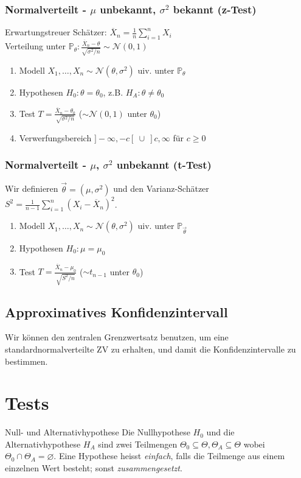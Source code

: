 \documentclass[a4paper,10pt]{article}
\def\P{\mathbb{P}}
\begin{document}
\subsubsection*{\texorpdfstring{Normalverteilt - \(\mu\) unbekannt, \(\sigma^2\) bekannt (z-Test)}{Normalverteilt - μ unbekannt, σ² bekannt (z-Test)}}
Erwartungstreuer Schätzer: \(\overline{X}_n = \frac{1}{n} \sum_{i=1}^n X_i\)\\
Verteilung unter \(\P_\theta: \frac{\overline{X}_n - \theta}{\sqrt{\sigma^2/n}} \sim \mathcal{N}(0,1)\)
\begin{enumerate}
	\item Modell \(X_1, \ldots, X_n \sim \mathcal{N}(\theta, \sigma^2)\) uiv. unter \(\P_\theta\)
	\item Hypothesen \(H_0 : \theta = \theta_0\), z.B. \(H_A : \theta \ne \theta_0\)
	\item Test \(T = \frac{\overline{X}_n - \theta_0}{\sqrt{\sigma^2/n}} \) ($\sim \mathcal{N}(0,1)$ unter $\theta_0$)
	\item Verwerfungsbereich \(]-\infty, -c[ \ \cup \ ] c, \infty\) für \(c\ge 0\)
\end{enumerate}

\subsubsection*{\texorpdfstring{Normalverteilt - \(\mu\), \(\sigma^2\) unbekannt (t-Test)}{Normalverteilt - μ, σ² unbekannt (t-Test)}}
Wir definieren \(\vec{\theta} = (\mu, \sigma^2)\) und den Varianz-Schätzer \(S^2 = \frac{1}{n-1}\sum_{i=1}^n (X_i - \overline{X}_n)^2\).
\begin{enumerate}
	\item Modell \(X_1, \ldots, X_n \sim \mathcal{N}(\theta, \sigma^2)\) uiv. unter \(\P_{\vec{\theta}}\)
	\item Hypothesen $H_0: \mu = \mu_0$
	\item Test \(T = \frac{\overline{X}_n - \mu_0}{\sqrt{S^2/n}}\) ($\sim t_{n-1}$ unter $\theta_0$)
\end{enumerate}

\subsection{Approximatives Konfidenzintervall}
Wir können den zentralen Grenzwertsatz benutzen, um eine standardnormalverteilte ZV zu erhalten, und damit die Konfidenzintervalle zu bestimmen.

\section{Tests}
\begin{subbox}{Null- und Alternativhypothese}
	Die Nullhypothese \(H_0\) und die Alternativhypothese \(H_A\) sind zwei Teilmengen \(\Theta_0 \subseteq \Theta, \Theta_A \subseteq \Theta\) wobei \(\Theta_0 \cap \Theta_A = \varnothing\). Eine Hypothese heisst \textit{einfach}, falls die Teilmenge aus einem einzelnen Wert besteht; sonst \textit{zusammengesetzt}.
\end{subbox}
\end{document}
